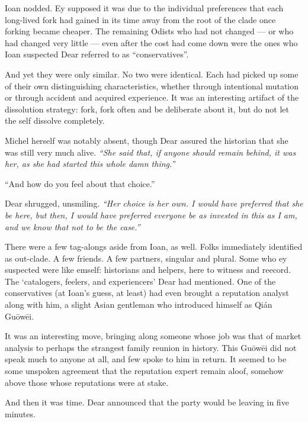 Ioan nodded. Ey supposed it was due to the individual preferences that each long-lived fork had gained in its time away from the root of the clade once forking became cheaper. The remaining Odists who had not changed — or who had changed very little — even after the cost had come down were the ones who Ioan suspected Dear referred to as ``conservatives''.

And yet they were only similar. No two were identical. Each had picked up some of their own distinguishing characteristics, whether through intentional mutation or through accident and acquired experience. It was an interesting artifact of the dissolution strategy: fork, fork often and be deliberate about it, but do not let the self dissolve completely.

Michel herself was notably absent, though Dear assured the historian that she was still very much alive. \emph{``She said that, if anyone should remain behind, it was her, as she had started this whole damn thing.''}

``And how do you feel about that choice.''

Dear shrugged, unsmiling. \emph{``Her choice is her own. I would have preferred that she be here, but then, I would have preferred everyone be as invested in this as I am, and we know that not to be the case.''}

There were a few tag-alongs aside from Ioan, as well. Folks immediately identified as out-clade. A few friends. A few partners, singular and plural. Some who ey suspected were like emself: historians and helpers, here to witness and reecord. The `catalogers, feelers, and experiencers' Dear had mentioned. One of the conservatives (at Ioan's guess, at least) had even brought a reputation analyst along with him, a slight Asian gentleman who introduced himself as Qián Guōwēi.

It was an interesting move, bringing along someone whose job was that of market analysis to perhaps the strangest family reunion in history. This Guōwēi did not speak much to anyone at all, and few spoke to him in return. It seemed to be some unspoken agreement that the reputation expert remain aloof, somehow above those whose reputations were at stake.

And then it was time. Dear announced that the party would be leaving in five minutes.
